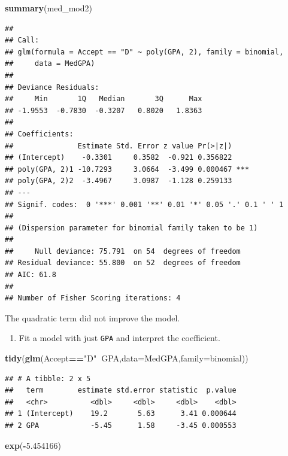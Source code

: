 \documentclass[
]{book}
\newenvironment{Shaded}{\begin{snugshade}}{\end{snugshade}}
\newcommand{\DataTypeTok}[1]{\textcolor[rgb]{0.13,0.29,0.53}{#1}}
\newcommand{\FloatTok}[1]{\textcolor[rgb]{0.00,0.00,0.81}{#1}}
\newcommand{\KeywordTok}[1]{\textcolor[rgb]{0.13,0.29,0.53}{\textbf{#1}}}
\newcommand{\NormalTok}[1]{#1}
\newcommand{\OperatorTok}[1]{\textcolor[rgb]{0.81,0.36,0.00}{\textbf{#1}}}
\newcommand{\StringTok}[1]{\textcolor[rgb]{0.31,0.60,0.02}{#1}}
\providecommand{\tightlist}{%
  \setlength{\itemsep}{0pt}\setlength{\parskip}{0pt}}
\begin{document}
\begin{Shaded}
\begin{Highlighting}[]
\KeywordTok{summary}\NormalTok{(med_mod2)}
\end{Highlighting}
\end{Shaded}

\begin{verbatim}
## 
## Call:
## glm(formula = Accept == "D" ~ poly(GPA, 2), family = binomial, 
##     data = MedGPA)
## 
## Deviance Residuals: 
##     Min       1Q   Median       3Q      Max  
## -1.9553  -0.7830  -0.3207   0.8020   1.8363  
## 
## Coefficients:
##               Estimate Std. Error z value Pr(>|z|)    
## (Intercept)    -0.3301     0.3582  -0.921 0.356822    
## poly(GPA, 2)1 -10.7293     3.0664  -3.499 0.000467 ***
## poly(GPA, 2)2  -3.4967     3.0987  -1.128 0.259133    
## ---
## Signif. codes:  0 '***' 0.001 '**' 0.01 '*' 0.05 '.' 0.1 ' ' 1
## 
## (Dispersion parameter for binomial family taken to be 1)
## 
##     Null deviance: 75.791  on 54  degrees of freedom
## Residual deviance: 55.800  on 52  degrees of freedom
## AIC: 61.8
## 
## Number of Fisher Scoring iterations: 4
\end{verbatim}

The quadratic term did not improve the model.

\begin{enumerate}
\def\labelenumi{\alph{enumi}.}
\setcounter{enumi}{3}
\tightlist
\item
  Fit a model with just \texttt{GPA} and interpret the coefficient.
\end{enumerate}

\begin{Shaded}
\begin{Highlighting}[]
\KeywordTok{tidy}\NormalTok{(}\KeywordTok{glm}\NormalTok{(Accept}\OperatorTok{==}\StringTok{"D"}\OperatorTok{~}\NormalTok{GPA,}\DataTypeTok{data=}\NormalTok{MedGPA,}\DataTypeTok{family=}\NormalTok{binomial))}
\end{Highlighting}
\end{Shaded}

\begin{verbatim}
## # A tibble: 2 x 5
##   term        estimate std.error statistic  p.value
##   <chr>          <dbl>     <dbl>     <dbl>    <dbl>
## 1 (Intercept)    19.2       5.63      3.41 0.000644
## 2 GPA            -5.45      1.58     -3.45 0.000553
\end{verbatim}

\begin{Shaded}
\begin{Highlighting}[]
\KeywordTok{exp}\NormalTok{(}\OperatorTok{-}\FloatTok{5.454166}\NormalTok{)}
\end{Highlighting}
\end{Shaded}
\end{document}
